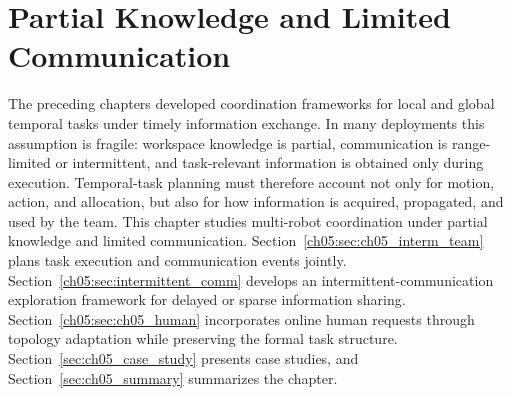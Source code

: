 \chapter{Partial Knowledge and Limited Communication}
\label{chap:communication}


The preceding chapters developed coordination frameworks for local and global
temporal tasks under timely information exchange. In many deployments this
assumption is fragile: workspace knowledge is partial, communication is
range-limited or intermittent, and task-relevant information is obtained only
during execution. Temporal-task planning must therefore account not only for
motion, action, and allocation, but also for how information is acquired,
propagated, and used by the team.
This chapter studies multi-robot coordination under partial knowledge and
limited communication. Section~\ref{ch05:sec:ch05_interm_team} plans task
execution and communication events jointly. Section~\ref{ch05:sec:intermittent_comm}
develops an intermittent-communication exploration framework for delayed or
sparse information sharing. Section~\ref{ch05:sec:ch05_human} incorporates
online human requests through topology adaptation while preserving the formal
task structure. Section~\ref{sec:ch05_case_study} presents case studies, and
Section~\ref{sec:ch05_summary} summarizes the chapter.





